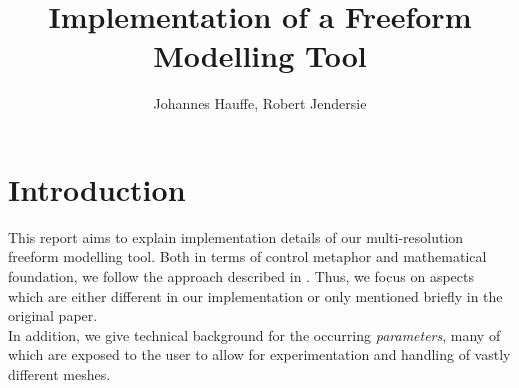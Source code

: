 \documentclass[twocolumn]{article}
\begin{document}
\title{Implementation of a Freeform Modelling Tool }


\author{Johannes Hauffe, Robert Jendersie}

\maketitle

\section{Introduction}
This report aims to explain implementation details of our multi-resolution freeform modelling tool.
Both in terms of control metaphor and mathematical foundation, we follow the approach described in  \cite{botsch2004intuitive}. Thus, we focus on aspects which are either different in our implementation or only mentioned briefly in the original paper.\\
In addition, we give technical background for the occurring \textit{parameters}, many of which are exposed to the user to allow for experimentation and handling of vastly different meshes.
\end{document}
